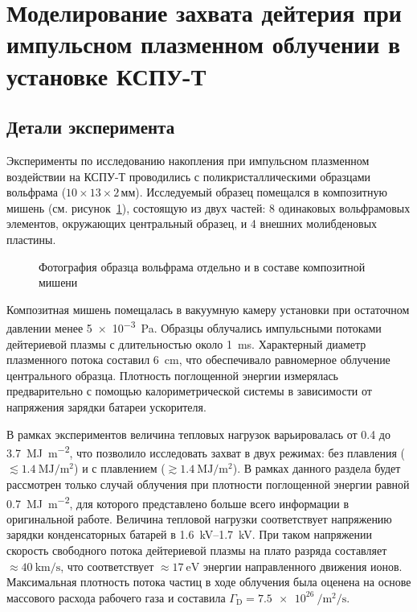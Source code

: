 
\section{Моделирование захвата дейтерия при импульсном плазменном облучении в установке КСПУ-Т}\label{sec:ch3/sec1}
\subsection{Детали эксперимента}\label{sec:ch3/sec1/subsec1}
Эксперименты по исследованию накопления при импульсном плазменном воздействии на КСПУ-Т проводились с поликристаллическими образцами вольфрама ($10\times13\times2$\,мм). Исследуемый образец помещался в композитную мишень (см. рисунок~\cref{fig:ch3/QSPA_target}), состоящую из двух частей: 8 одинаковых вольфрамовых элементов, окружающих центральный образец, и 4 внешних молибденовых пластины.
\begin{figure}[ht]
	\caption{Фотография образца вольфрама отдельно и в составе композитной мишени~\cite{Poskakalov2020}}\label{fig:ch3/QSPA_target}
\end{figure}
Композитная мишень помещалась в вакуумную камеру установки при остаточном давлении менее \SI{5e-3}{\pascal}. Образцы облучались импульсными потоками дейтериевой плазмы с длительностью около \SI{1}{\milli\second}. Характерный диаметр плазменного потока составил \SI{6}{\centi\meter}, что обеспечивало равномерное облучение центрального образца. Плотность поглощенной энергии измерялась предварительно с помощью калориметрической системы в зависимости от напряжения зарядки батареи ускорителя. 

В рамках экспериментов величина тепловых нагрузок варьировалась от \num{0.4} до \SI{3.7}{\mega\joule\per\meter\squared}, что позволило исследовать захват в двух режимах: без плавления (\( \lesssim \SI{1.4}{\mega\joule\per\meter\squared} \)) и с плавлением (\( \gtrsim \SI{1.4}{\mega\joule\per\meter\squared} \)). В рамках данного раздела будет рассмотрен только случай облучения при плотности поглощенной энергии равной \SI{0.7}{\mega\joule\per\meter\squared}, для которого представлено больше всего информации в оригинальной работе. Величина тепловой нагрузки соответствует напряжению зарядки конденсаторных батарей в \SIrange{1.6}{1.7}{\kilo\volt}. При таком напряжении скорость свободного потока дейтериевой плазмы на плато разряда составляет \(\approx \SI{40}{\kilo\meter\per\second} \), что соответствует \(\approx \SI{17}{\electronvolt} \) энергии направленного движения ионов. Максимальная плотность потока частиц в ходе облучения была оценена на основе массового расхода рабочего газа и составила \( \Gamma_\mathrm{D}=\SI{7.5e26}{\per\meter\squared\per\second} \).

